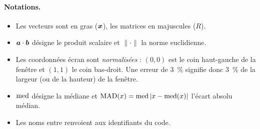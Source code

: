 \paragraph{Notations.}
\begin{itemize}
  \item Les vecteurs sont en gras ($\bm{x}$), les matrices en majuscules ($R$).
  \item $\bm{a}\cdot\bm{b}$ désigne le produit scalaire et $\|\cdot\|$ la norme euclidienne.
  \item Les coordonnées écran sont \emph{normalisées} : $(0,0)$ est le coin haut-gauche de la fenêtre et $(1,1)$ le coin bas-droit. Une erreur de \qty{3}{\percent} signifie donc \qty{3}{\percent} de la largeur (ou de la hauteur) de la fenêtre.
  \item $\operatorname{med}$ désigne la médiane et $\operatorname{MAD}(x) = \operatorname{med}|x - \operatorname{med}(x)|$ l'écart absolu médian.
  \item Les noms entre  renvoient aux identifiants du code.
\end{itemize}
